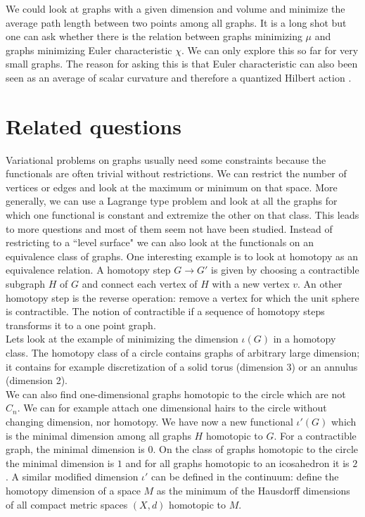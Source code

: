 \documentclass[12pt]{amsart}
\theoremstyle{definition}
\begin{document}
We could look at graphs with a given dimension and volume and minimize the average path
length between two points among all graphs. It is a long shot but one can ask
whether there is the relation between graphs minimizing $\mu$ and 
graphs minimizing Euler characteristic $\chi$. We can only explore this so far for very 
small graphs. The reason for asking this is that Euler characteristic can also been seen 
as an average of scalar curvature and therefore a quantized Hilbert action 
\cite{eveneuler}.

\section{Related questions}

Variational problems on graphs usually need some constraints because  the functionals are often
trivial without restrictions. We can restrict the 
number of vertices or edges and look at the maximum or minimum on that space. 
More generally, we can use a Lagrange type problem and look at all the graphs for which one
functional is constant and extremize the other on that class. This leads to more
questions and most of them seem not have been studied. Instead of restricting to a ``level surface"
we can also look at the functionals on an equivalence class of graphs. One interesting 
example is to look at homotopy as an equivalence relation. A homotopy step $G \to G'$ is given by
choosing a contractible subgraph $H$ of $G$  and connect each vertex of $H$ with a new vertex $v$.
An other homotopy step is the reverse operation: remove a vertex for which the unit sphere is 
contractible. The notion of contractible if a sequence of homotopy steps transforms it to a one
point graph.  \\

Lets look at the example of minimizing the dimension $\iota(G)$ in a homotopy class. The 
homotopy class of a circle contains  graphs of arbitrary 
large dimension; it contains for example
discretization of a solid torus (dimension 3) or an annulus (dimension 2). \\

We can also find one-dimensional graphs homotopic to the circle which are not $C_n$.
We can for example attach one dimensional hairs to the circle without changing dimension,
nor homotopy. We have now a new functional $\iota'(G)$ which is the minimal dimension
among all graphs $H$ homotopic to $G$. For a contractible graph, the minimal dimension
is $0$. On the class of graphs homotopic to the circle the minimal dimension 
is $1$ and for all graphs homotopic to an  icosahedron it is $2$. 
A similar modified dimension $\iota'$ can be defined
in the continuum: define the homotopy dimension of a space $M$ as the minimum of
the Hausdorff dimensions of all compact metric spaces $(X,d)$ homotopic to $M$. \\
\end{document}

